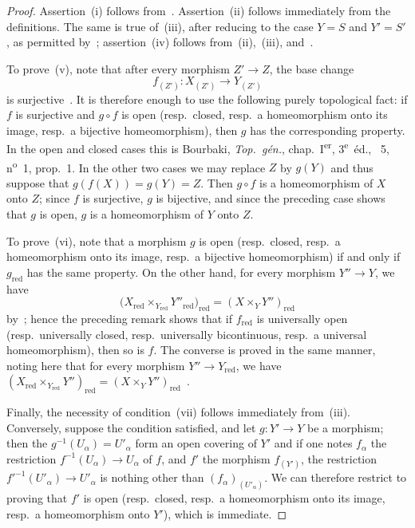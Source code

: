 \begin{proof}
Assertion~(i) follows from~.
Assertion~(ii) follows immediately from the definitions. The same is true of~(iii), after reducing to the case $Y=S$ and $Y'=S'$, as permitted by~; assertion~(iv) follows from~(ii),~(iii), and~.

To prove~(v), note that after every morphism $Z'\to Z$, the base change
\[
  f_{(Z')}:X_{(Z')}\longrightarrow Y_{(Z')}
\]
is surjective~. It is therefore enough to use the following purely topological fact: if $f$ is surjective and $g\circ f$ is open \textnormal{(}resp.\ closed, resp.\ a homeomorphism onto its image, resp.\ a bijective homeomorphism\textnormal{)}, then $g$ has the corresponding property. In the open and closed cases this is Bourbaki, \emph{Top.~g\'{e}n.}, chap.~I\textsuperscript{er}, 3\textsuperscript{e}~\'{e}d., \textsection~5, n\textsuperscript{o}~1, prop.~1. In the other two cases we may replace $Z$ by $g(Y)$ and thus suppose that $g(f(X))=g(Y)=Z$. Then $g\circ f$ is a homeomorphism of $X$ onto $Z$; since $f$ is surjective, $g$ is bijective, and since the preceding case shows that $g$ is open, $g$ is a homeomorphism of $Y$ onto $Z$.

To prove~(vi), note that a morphism $g$ is open \textnormal{(}resp.\ closed, resp.\ a homeomorphism onto its image, resp.\ a bijective homeomorphism\textnormal{)} if and only if $g_{\mathrm{red}}$ has the same property.
On the other hand, for every morphism $Y''\to Y$, we have
\[
  \bigl(X_{\mathrm{red}}\times_{Y_{\mathrm{red}}}Y''_{\mathrm{red}}\bigr)_{\mathrm{red}}
  =(X\times_Y Y'')_{\mathrm{red}}
\]
by~; hence the preceding remark shows that if $f_{\mathrm{red}}$ is universally open \textnormal{(}resp.\ universally closed, resp.\ universally bicontinuous, resp.\ a universal homeomorphism\textnormal{)}, then so is $f$.
The converse is proved in the same manner, noting here that for every morphism $Y''\to Y_{\mathrm{red}}$, we have $(X_{\mathrm{red}}\times_{Y_{\mathrm{red}}}Y'')_{\mathrm{red}}=(X\times_Y Y'')_{\mathrm{red}}$~.

Finally, the necessity of condition~(vii) follows immediately from~(iii).
Conversely, suppose the condition satisfied, and let $g:Y'\to Y$ be a morphism; then the $g^{-1}(U_\alpha)=U'_\alpha$ form an open covering of $Y'$ and if one notes $f_\alpha$ the restriction $f^{-1}(U_\alpha)\to U_\alpha$ of $f$, and $f'$ the morphism $f_{(Y')}$, the restriction $f'^{-1}(U'_\alpha)\to U'_\alpha$ is nothing other than $(f_\alpha)_{(U'_\alpha)}$.
We can therefore restrict to proving that $f'$ is open \textnormal{(}resp.\ closed, resp.\ a homeomorphism onto its image, resp.\ a homeomorphism onto $Y'$\textnormal{)}, which is immediate.
\end{proof}

